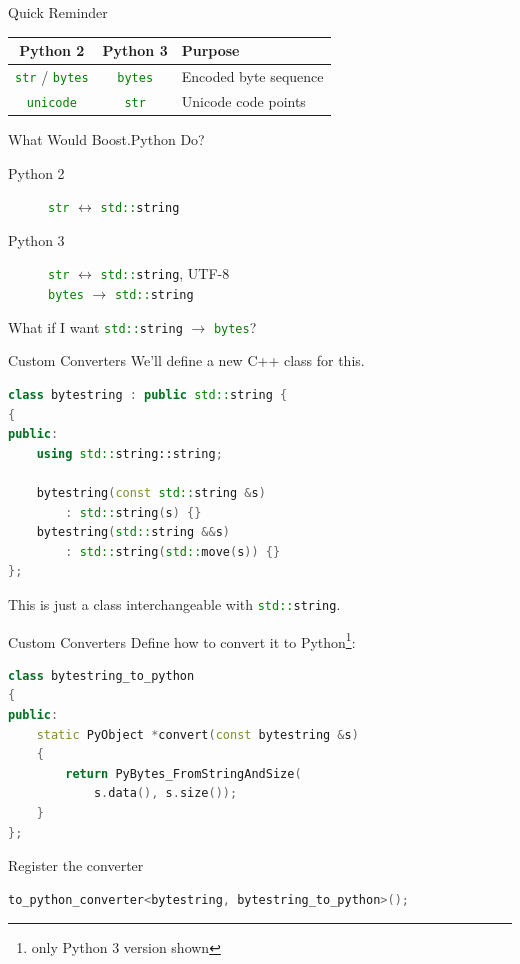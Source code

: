 \documentclass{beamer}
\def\linlinep{\lstinline[basicstyle=\ttfamily,language=python]}
\def\linlinec{\lstinline[basicstyle=\ttfamily,language=c++]}
\begin{document}
\begin{frame}{Quick Reminder}
  \centering
  \begin{tabular}{ccl}
    \toprule
    \textbf{Python 2} & \textbf{Python 3} & \textbf{Purpose}\\
    \midrule
    \linlinep"str" / \linlinep"bytes" & \linlinep"bytes" & Encoded byte sequence\\
    \linlinep"unicode" & \linlinep"str" & Unicode code points\\
    \bottomrule
  \end{tabular}
\end{frame}

\begin{frame}{What Would Boost.Python Do?}
  \begin{description}
    \item[Python 2] \linlinep"str" $\leftrightarrow$ \linlinec"std::string"
    \item[Python 3] \linlinep"str" $\leftrightarrow$ \linlinec"std::string", UTF-8\\
                    \linlinep"bytes" $\rightarrow$ \linlinec"std::string"
  \end{description}
  \pause
  What if I want \linlinec"std::string" $\rightarrow$ \linlinep"bytes"?
\end{frame}

\begin{frame}[fragile=singleslide]{Custom Converters}
We'll define a new C++ class for this.
  \begin{lstlisting}[language=c++]
class bytestring : public std::string {
{
public:
    using std::string::string;

    bytestring(const std::string &s)
        : std::string(s) {}
    bytestring(std::string &&s)
        : std::string(std::move(s)) {}
};
  \end{lstlisting}

This is just a class interchangeable with \linlinec"std::string".
\end{frame}

\begin{frame}[fragile=singleslide]{Custom Converters}
  Define how to convert it to Python\footnote{only Python 3 version shown}:
  \begin{lstlisting}[language=c++]
class bytestring_to_python
{
public:
    static PyObject *convert(const bytestring &s)
    {
        return PyBytes_FromStringAndSize(
            s.data(), s.size());
    }
};
  \end{lstlisting}

  Register the converter
  \begin{lstlisting}[language=c++]
to_python_converter<bytestring, bytestring_to_python>();
  \end{lstlisting}
\end{frame}
\end{document}
